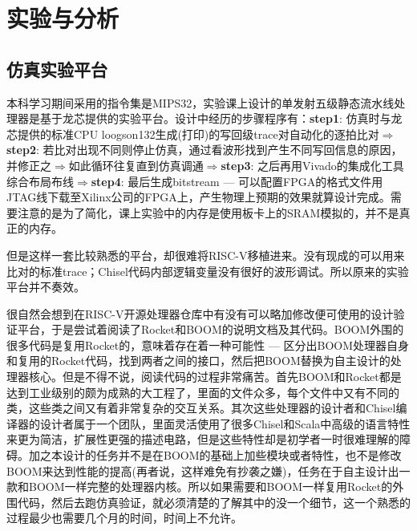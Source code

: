 \chapter{实验与分析}\label{chap:analysis}

\section{仿真实验平台}

本科学习期间采用的指令集是MIPS32，实验课上设计的单发射五级静态流水线处理器是基于龙芯提供的实验平台。设计中经历的步骤程序有：\textbf{step1}: 仿真时与龙芯提供的标准CPU loogson132生成(打印)的写回级trace对自动化的逐拍比对$ \Rightarrow $\textbf{step2}: 若比对出现不同则停止仿真，通过看波形找到产生不同写回信息的原因，并修正之$ \Rightarrow $如此循环往复直到仿真调通$ \Rightarrow $\textbf{step3}: 之后再用Vivado的集成化工具综合布局布线$ \Rightarrow $\textbf{step4}: 最后生成bitstream --- 可以配置FPGA的格式文件用JTAG线下载至Xilinx公司的FPGA上，产生物理上预期的效果就算设计完成。需要注意的是为了简化，课上实验中的内存是使用板卡上的SRAM模拟的，并不是真正的内存。

但是这样一套比较熟悉的平台，却很难将RISC-V移植进来。没有现成的可以用来比对的标准trace；Chisel代码内部逻辑变量没有很好的波形调试。所以原来的实验平台并不奏效。

很自然会想到在RISC-V开源处理器仓库中有没有可以略加修改便可使用的设计验证平台，于是尝试着阅读了Rocket和BOOM的说明文档及其代码。BOOM外围的很多代码是复用Rocket的，意味着存在着一种可能性 --- 区分出BOOM处理器自身和复用的Rocket代码，找到两者之间的接口，然后把BOOM替换为自主设计的处理器核心。但是不得不说，阅读代码的过程非常痛苦。首先BOOM和Rocket都是达到工业级别的颇为成熟的大工程了，里面的文件众多，每个文件中又有不同的类，这些类之间又有着非常复杂的交互关系。其次这些处理器的设计者和Chisel编译器的设计者属于一个团队，里面灵活使用了很多Chisel和Scala中高级的语言特性来更为简洁，扩展性更强的描述电路，但是这些特性却是初学者一时很难理解的障碍。加之本设计的任务并不是在BOOM的基础上加些模块或者特性，也不是修改BOOM来达到性能的提高(再者说，这样难免有抄袭之嫌)，任务在于自主设计出一款和BOOM一样完整的处理器内核。所以如果需要和BOOM一样复用Rocket的外围代码，然后去跑仿真验证，就必须清楚的了解其中的没一个细节，这一个熟悉的过程最少也需要几个月的时间，时间上不允许。

